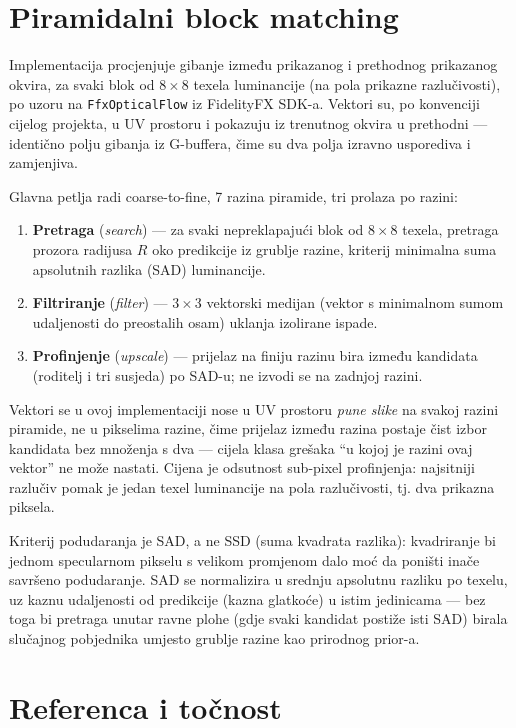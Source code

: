 \documentclass{mathos}
\begin{document}
\section{Piramidalni block matching}

Implementacija procjenjuje gibanje između prikazanog i prethodnog
prikazanog okvira, za svaki blok od $8\times8$ texela luminancije (na pola
prikazne razlučivosti), po uzoru na \verb+FfxOpticalFlow+ iz FidelityFX SDK-a.
Vektori su, po konvenciji cijelog projekta, u UV prostoru i pokazuju iz
trenutnog okvira u prethodni — identično polju gibanja iz G-buffera, čime su
dva polja izravno usporediva i zamjenjiva.

Glavna petlja radi coarse-to-fine, 7 razina piramide, tri prolaza po razini:

\begin{enumerate}
\item \textbf{Pretraga} (\emph{search}) — za svaki nepreklapajući blok od
$8\times8$ texela, pretraga prozora radijusa $R$ oko predikcije iz grublje
razine, kriterij minimalna suma apsolutnih razlika (SAD) luminancije.
\item \textbf{Filtriranje} (\emph{filter}) — $3\times3$ vektorski medijan
(vektor s minimalnom sumom udaljenosti do preostalih osam) uklanja izolirane
ispade.
\item \textbf{Profinjenje} (\emph{upscale}) — prijelaz na finiju razinu bira
između kandidata (roditelj i tri susjeda) po SAD-u; ne izvodi se na zadnjoj
razini.
\end{enumerate}

Vektori se u ovoj implementaciji nose u UV prostoru \emph{pune slike} na
svakoj razini piramide, ne u pikselima razine, čime prijelaz između razina
postaje čist izbor kandidata bez množenja s dva — cijela klasa grešaka ``u
kojoj je razini ovaj vektor'' ne može nastati. Cijena je odsutnost sub-pixel
profinjenja: najsitniji razlučiv pomak je jedan texel luminancije na pola
razlučivosti, tj. dva prikazna piksela.

Kriterij podudaranja je SAD, a ne SSD (suma kvadrata razlika): kvadriranje bi
jednom specularnom pikselu s velikom promjenom dalo moć da poništi inače
savršeno podudaranje. SAD se normalizira u srednju apsolutnu razliku po
texelu, uz kaznu udaljenosti od predikcije (kazna glatkoće) u istim
jedinicama — bez toga bi pretraga unutar ravne plohe (gdje svaki kandidat
postiže isti SAD) birala slučajnog pobjednika umjesto grublje razine kao
prirodnog prior-a.

\section{Referenca i točnost}
\end{document}
